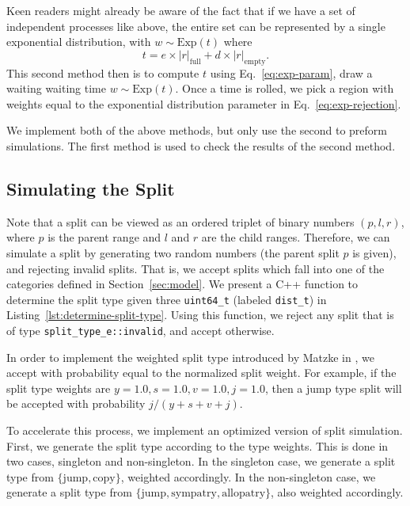 \documentclass[a4paper]{article}
\newcommand{\CountFull}[1]{|#1|_\text{full}}
\newcommand{\CountEmpty}[1]{|#1|_\text{empty}}
\begin{document}
Keen readers might already be aware of the fact that if we have a set of
independent processes like above, the entire set can be represented by a single
exponential distribution, with \(w \sim \text{Exp}(t) \) where
\begin{equation}
	\label{eq:exp-param} t = e \times \CountFull{r} + d \times \CountEmpty{r}.
\end{equation}
This second method then is to compute \( t \) using Eq.~\ref{eq:exp-param},
draw a waiting waiting time \( w \sim \text{Exp}(t) \).
Once a time is rolled, we pick a region with weights equal to the exponential
distribution parameter in Eq.~\ref{eq:exp-rejection}.

We implement both of the above methods, but only use the second to preform
simulations.
The first method is used to check the results of the second method.

\subsection{Simulating the Split}

Note that a split can be viewed as an ordered triplet of binary numbers \(
(p,l,r) \), where $p$ is the parent range and $l$ and $r$ are the child ranges.
Therefore, we can simulate a split by generating two random numbers (the parent
split $p$ is given), and rejecting invalid splits.
That is, we accept splits which fall into one of the categories defined in
Section~\ref{sec:model}.
We present a C++ function to determine the split type given three
\texttt{uint64_t} (labeled \texttt{dist_t}) in
Listing~\ref{lst:determine-split-type}.
Using this function, we reject any split that is of type
\texttt{split_type_e::invalid}, and accept otherwise.

In order to implement the weighted split type introduced by Matzke in
\cite{ModelSelectionMatzke2014}, we accept with probability equal to the
normalized split weight.
For example, if the split type weights are $y = 1.0, s = 1.0, v = 1.0, j=1.0$,
then a jump type split will be accepted with probability $j/(y + s + v +
j)$.

To accelerate this process, we implement an optimized version of split
simulation.
First, we generate the split type according to the type weights.
This is done in two cases, singleton and non-singleton.
In the singleton case, we generate a split type from $\{\text{jump},
\text{copy}\}$, weighted accordingly.
In the non-singleton case, we generate a split type from $\{\text{jump},
\text{sympatry}, \text{allopatry}\}$, also weighted accordingly.
\end{document}
